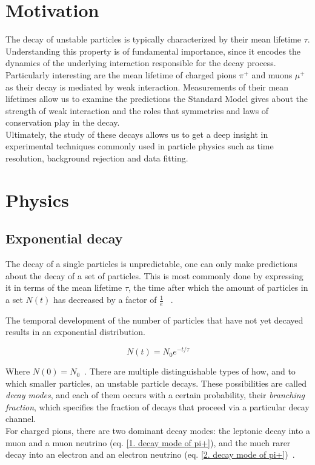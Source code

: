 \documentclass[11pt,a4paper]{article}
\begin{document}
\section{Motivation}
The %
decay of unstable particles is typically characterized by their mean lifetime $\tau$. 
Understanding this property is of fundamental importance, since it encodes the dynamics of the underlying interaction responsible for the decay process.
Particularly interesting are the mean lifetime of charged pions $\pi^+$ and muons $\mu^+$ as their decay is mediated by weak interaction. Measurements of their mean lifetimes allow us to examine the predictions the Standard Model gives about the strength of weak interaction and the roles that symmetries and laws of conservation play in the decay. \\
Ultimately, the study of these %
decays allows us to get a deep insight in experimental techniques commonly used in particle physics such as time resolution, background rejection and data fitting. \\

\section{Physics}

\subsection{Exponential decay}
The decay of a single particles is unpredictable, one can only make predictions about the decay of a set of particles. This is most commonly done by expressing it in terms of the mean lifetime $\tau$, the time after which the amount of particles in a set $N(t) $ has decreased by a factor of $\frac{1}{e}$~\cite{Mittlere Lebensdauer} .

The temporal development of the number of particles that have not yet decayed results in an exponential distribution.

\begin{equation}
N(t)=N_\text{0}e^{-t/\tau}
\label{Exponential decay}
\end{equation}

Where $N(0)=N_0$~\cite{Lebensdauer}. There are multiple distinguishable types of how, and to which smaller particles, an unstable particle decays. These possibilities are called \textit{decay modes}, and each of them occurs with a certain probability, their \textit{branching fraction}, which specifies the fraction of decays that proceed via a particular decay channel.\\
For charged pions, there are two dominant decay modes: the leptonic decay into a muon and a muon neutrino (eq. \ref{1. decay mode of pi+}), and the much rarer decay into an electron and an electron neutrino (eq. \ref{2. decay mode of pi+})~\cite{Povh}.
\end{document}
